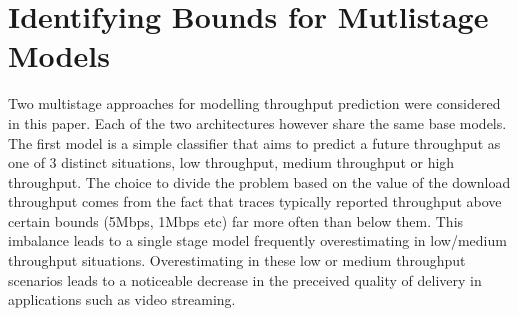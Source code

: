 \section{Identifying Bounds for Mutlistage Models}
Two multistage approaches for modelling throughput prediction were considered in this paper. Each of the two architectures however share the same base models. The first model is a simple classifier that aims to predict a future throughput as one of 3 distinct situations, low throughput, medium throughput or high throughput. The choice to divide the problem based on the value of the download throughput comes from the fact that traces typically reported throughput above certain bounds (5Mbps, 1Mbps etc) far more often than below them. This imbalance leads to a single stage model frequently overestimating in low/medium throughput situations. Overestimating in these low or medium throughput scenarios leads to a noticeable decrease in the preceived quality of delivery in applications such as video streaming.